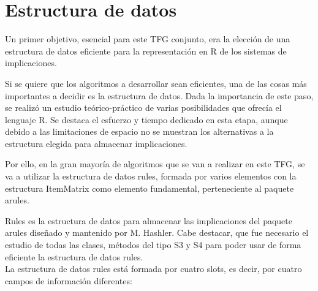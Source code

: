 \section{Estructura de datos}

Un primer objetivo, esencial para este TFG conjunto, era la elecci\'on 
de una estructura de datos eficiente para la representaci\'on en R de los 
sistemas de implicaciones.

Si se quiere que los algoritmos a desarrollar sean eficientes, una de las cosas m\'as 
importantes a decidir es la estructura de datos. Dada la importancia de este paso, se realiz\'o 
un estudio te\'orico-pr\'actico de varias posibilidades que ofrec\'ia el lenguaje R. Se destaca 
el esfuerzo y tiempo dedicado en esta etapa, aunque debido a las limitaciones de espacio no se 
muestran los alternativas a la estructura elegida para almacenar implicaciones.

Por ello, en la gran mayor\'ia de algoritmos que se van a realizar 
en este TFG, se va a utilizar la estructura de datos rules, formada por varios 
elementos con la estructura ItemMatrix como elemento fundamental, perteneciente al paquete 
arules.

Rules es la estructura de datos para almacenar las implicaciones del paquete arules dise\~nado y mantenido 
por M. Hashler. Cabe destacar, que fue necesario el estudio de todas las clases, m\'etodos del tipo S3 y S4 para 
poder usar de forma eficiente la estructura de datos rules.
\\

La estructura de datos rules est\'a formada por cuatro slots, es decir, por 
cuatro campos de informaci\'on diferentes:

